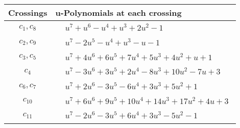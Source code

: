 \documentclass[1p]{elsarticle_modified}
\theoremstyle{definition}
\begin{document}
\begin{tabular}{m{50pt}|m{274pt}}
Crossings & \hspace{64pt}u-Polynomials at each crossing \\
\hline $$\begin{aligned}c_{1},c_{8}\end{aligned}$$&$\begin{aligned}
&u^7+u^6- u^4+u^3+2 u^2-1
\end{aligned}$\\
\hline $$\begin{aligned}c_{2},c_{9}\end{aligned}$$&$\begin{aligned}
&u^7-2 u^5- u^4+u^3- u-1
\end{aligned}$\\
\hline $$\begin{aligned}c_{3},c_{5}\end{aligned}$$&$\begin{aligned}
&u^7+4 u^6+6 u^5+7 u^4+5 u^3+4 u^2+u+1
\end{aligned}$\\
\hline $$\begin{aligned}c_{4}\end{aligned}$$&$\begin{aligned}
&u^7-3 u^6+3 u^5+2 u^4-8 u^3+10 u^2-7 u+3
\end{aligned}$\\
\hline $$\begin{aligned}c_{6},c_{7}\end{aligned}$$&$\begin{aligned}
&u^7+2 u^6-3 u^5-6 u^4+3 u^3+5 u^2+1
\end{aligned}$\\
\hline $$\begin{aligned}c_{10}\end{aligned}$$&$\begin{aligned}
&u^7+6 u^6+9 u^5+10 u^4+14 u^3+17 u^2+4 u+3
\end{aligned}$\\
\hline $$\begin{aligned}c_{11}\end{aligned}$$&$\begin{aligned}
&u^7-2 u^6-3 u^5+6 u^4+3 u^3-5 u^2-1
\end{aligned}$\\
\hline
\end{tabular}\\~\\
\newpage\renewcommand{\arraystretch}{1}
\end{document}
